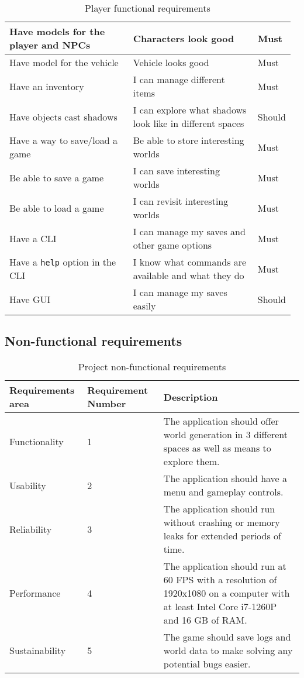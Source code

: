 \documentclass[12pt]{article}
\begin{document}
\begin{table}[H]
\begin{tabular}{p{0.45\linewidth}|p{0.45\linewidth}|p{0.07\linewidth}}
        Have models for the player and NPCs & Characters look good & Must \\ \hline
        Have model for the vehicle & Vehicle looks good & Must\\ \hline
        Have an inventory & I can manage different items & Must \\ \hline
        Have objects cast shadows & I can explore what shadows look like in different spaces & Should \\ \hline
        Have a way to save/load a game & Be able to store interesting worlds & Must \\ \hline
        Be able to save a game & I can save interesting worlds & Must \\ \hline
        Be able to load a game & I can revisit interesting worlds & Must \\ \hline
        Have a CLI & I can manage my saves and other game options & Must \\ \hline
        Have a \texttt{help} option in the CLI & I know what commands are available and what they do & Must \\ \hline
        Have GUI & I can manage my saves easily & Should \\ \hline
        
    \end{tabular}
\caption{Player functional requirements}
\end{table}

\subsection{Non-functional requirements}

\begin{table}[H]
    \begin{tabular}{|l|p{2.2cm}|p{11cm}|}
    \hline
        \textbf{Requirements area} & \textbf{Requirement Number} & \textbf{Description} \\ \hline
        Functionality & 1 & The application should offer world generation in 3 different spaces as well as means to explore them. \\ \hline
        Usability & 2 & The application should have a menu and gameplay controls. \\ \hline
        Reliability & 3 & The application should run without crashing or memory leaks for extended periods of time. \\ \hline
        Performance & 4 & The application should run at 60 FPS with a resolution of 1920x1080 on a computer with at least Intel Core i7-1260P and 16 GB of RAM. \\ \hline
        Sustainability & 5 & The game should save logs and world data to make solving any potential bugs easier. \\ \hline
    \end{tabular}
\caption{Project non-functional requirements}
\end{table}
\end{document}
